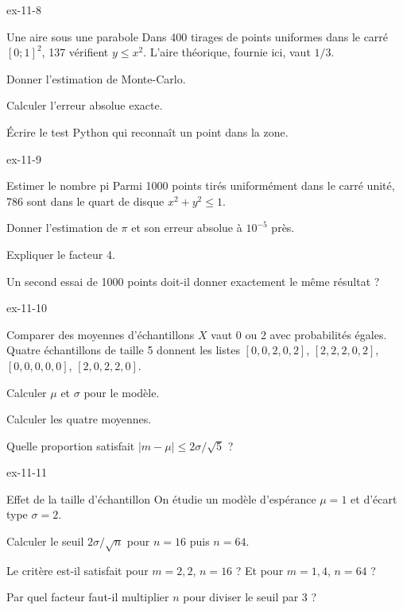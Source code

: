 \begin{blocLivre}{ex-11-8}
\begin{exercice}[2]{Une aire sous une parabole}
Dans 400 tirages de points uniformes dans le carré $[0;1]^2$, 137 vérifient $y\leq x^2$. L’aire théorique, fournie ici, vaut $1/3$.\begin{questions}
\item Donner l’estimation de Monte-Carlo.
\item Calculer l’erreur absolue exacte.
\item Écrire le test Python qui reconnaît un point dans la zone.
\end{questions}
\label{figlivre-r11-08-zone-ex}

\end{exercice}
\end{blocLivre}
\begin{blocLivre}{ex-11-9}
\begin{exercice}[2]{Estimer le nombre pi}
Parmi 1000 points tirés uniformément dans le carré unité, 786 sont dans le quart de disque $x^2+y^2\leq1$.\begin{questions}
\item Donner l’estimation de $\pi$ et son erreur absolue à $10^{-5}$ près.
\item Expliquer le facteur 4.
\item Un second essai de 1000 points doit-il donner exactement le même résultat ?
\end{questions}
\label{figlivre-r11-09-zone-ex}

\end{exercice}
\end{blocLivre}
\begin{blocLivre}{ex-11-10}
\begin{exercice}[2]{Comparer des moyennes d'échantillons}
$X$ vaut 0 ou 2 avec probabilités égales. Quatre échantillons de taille 5 donnent les listes $[0,0,2,0,2]$, $[2,2,2,0,2]$, $[0,0,0,0,0]$, $[2,0,2,2,0]$.\begin{questions}
\item Calculer $\mu$ et $\sigma$ pour le modèle.
\item Calculer les quatre moyennes.
\item Quelle proportion satisfait $|m-\mu|\leq2\sigma/\sqrt5$ ?
\end{questions}
\end{exercice}
\end{blocLivre}
\begin{blocLivre}{ex-11-11}
\begin{exercice}[2]{Effet de la taille d'échantillon}
On étudie un modèle d’espérance $\mu=1$ et d’écart type $\sigma=2$.\begin{questions}
\item Calculer le seuil $2\sigma/\sqrt n$ pour $n=16$ puis $n=64$.
\item Le critère est-il satisfait pour $m=2{,}2$, $n=16$ ? Et pour $m=1{,}4$, $n=64$ ?
\item Par quel facteur faut-il multiplier $n$ pour diviser le seuil par 3 ?
\end{questions}
\end{exercice}
\end{blocLivre}
